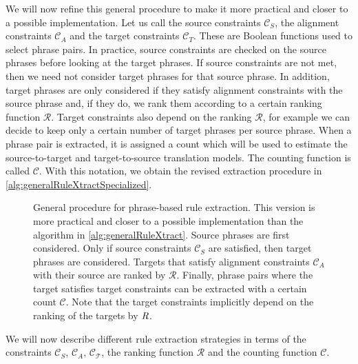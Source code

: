 We will now refine this general procedure to make it more practical and
closer to a possible implementation.
Let us call the source constraints $\mathcal{C}_S$, the alignment constraints
$\mathcal{C}_A$ and the target constraints $\mathcal{C}_T$. These are
Boolean functions used to select phrase pairs. In practice, source
constraints are checked on the source phrases before looking
at the target phrases. If source constraints are not met, then we need not
consider target phrases for that source phrase.
In addition, target phrases are only considered if they
satisfy alignment constraints with the source phrase and, if they do, we rank
them according to a certain ranking function $\mathcal{R}$. Target constraints also
depend on the ranking $\mathcal{R}$, for example we can decide to keep only a certain
number of target phrases per source phrase. When a phrase pair is extracted, it
is assigned a count which will be used to estimate the source-to-target and
target-to-source translation models. The counting function is called $\mathcal{C}$.
With this notation, we obtain the revised extraction procedure in
\autoref{alg:generalRuleXtractSpecialized}.
%
\begin{figure}
  \begin{algorithmic}[1]
         
        \EndIf
         
           
          \EndIf
        \EndFor
         
           
          \EndIf
        \EndFor
      \EndFor
    \EndFunction
  \end{algorithmic}
  \caption{General procedure for phrase-based rule extraction. This version
  is more practical and closer to a possible implementation than the algorithm in \autoref{alg:generalRuleXtract}.
  Source phrases are first considered. Only if source constraints $\mathcal{C}_S$ are satisfied, then
  target phrases are considered. Targets that satisfy alignment constraints $\mathcal{C}_A$ with
  their
  source are ranked by $\mathcal{R}$. Finally, phrase pairs where the target
  satisfies target constraints can be extracted with a certain count $\mathcal{C}$.
  Note that the target constraints implicitly depend on the ranking of the
  targets by $\emph{R}$.}
  \label{alg:generalRuleXtractSpecialized}
\end{figure}
%
We will now describe different rule extraction strategies in terms of
the constraints $\mathcal{C}_S$, $\mathcal{C}_A$, $\mathcal{C_T}$,
the ranking function $\mathcal{R}$ and the counting function $\mathcal{C}$.

